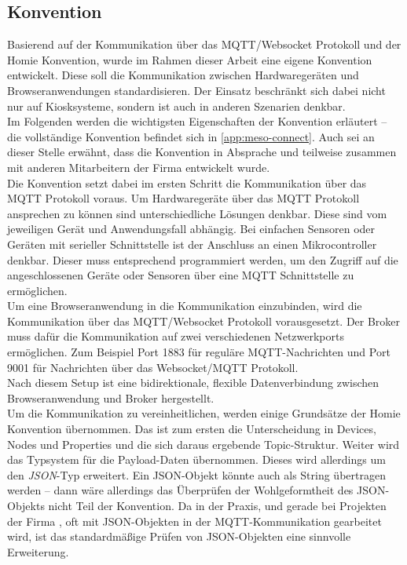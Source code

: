 \subsection{Konvention}
\label{subs:konvention}

Basierend auf der Kommunikation über das MQTT/Websocket Protokoll und der Homie Konvention,
wurde im Rahmen dieser Arbeit eine eigene Konvention entwickelt. Diese soll die Kommunikation
zwischen Hardwaregeräten und Browseranwendungen standardisieren. Der Einsatz beschränkt
sich dabei nicht nur auf Kiosksysteme, sondern ist auch in anderen Szenarien denkbar.\\
Im Folgenden werden die wichtigsten Eigenschaften der Konvention erläutert -- die vollständige
Konvention befindet sich in \autoref{app:meso-connect}. Auch sei an dieser Stelle erwähnt,
dass die Konvention in Absprache und teilweise zusammen mit anderen Mitarbeitern 
der Firma \meso{} entwickelt wurde.\\

Die Konvention setzt dabei im ersten Schritt die Kommunikation über das MQTT Protokoll voraus.
Um Hardwaregeräte über das MQTT Protokoll ansprechen zu können sind unterschiedliche Lösungen 
denkbar. Diese sind vom jeweiligen Gerät und Anwendungsfall abhängig. Bei einfachen Sensoren oder
Geräten mit serieller Schnittstelle ist der Anschluss an einen Mikrocontroller denkbar.
Dieser muss entsprechend programmiert werden, um den Zugriff auf die angeschlossenen Geräte 
oder Sensoren über eine MQTT Schnittstelle zu ermöglichen.\\
Um eine Browseranwendung in die Kommunikation einzubinden, wird die Kommunikation über das MQTT/Websocket
Protokoll vorausgesetzt. Der Broker muss dafür die Kommunikation auf zwei verschiedenen 
Netzwerkports ermöglichen. Zum Beispiel Port 1883 für reguläre MQTT-Nachrichten und Port 9001
für Nachrichten über das Websocket/MQTT Protokoll.\\
Nach diesem Setup ist eine bidirektionale, flexible Datenverbindung zwischen Browseranwendung
und Broker hergestellt.\\

Um die Kommunikation zu vereinheitlichen, werden einige Grundsätze der Homie Konvention übernommen.
Das ist zum ersten die Unterscheidung in Devices, Nodes und Properties und die sich daraus 
ergebende Topic-Struktur. Weiter wird das Typsystem für die Payload-Daten übernommen. 
Dieses wird allerdings um den \emph{JSON}-Typ erweitert. 
Ein JSON-Objekt könnte auch als String übertragen werden -- dann wäre allerdings
das Überprüfen der Wohlgeformtheit des JSON-Objekts nicht Teil der Konvention.
Da in der Praxis, und gerade bei Projekten der Firma \meso{}, oft mit JSON-Objekten in der 
MQTT-Kommunikation gearbeitet wird, ist das standardmäßige Prüfen von JSON-Objekten eine
sinnvolle Erweiterung.

